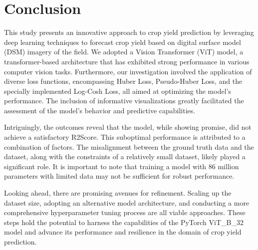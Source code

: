 \section{Conclusion}
\label{sec:conclusion}

This study presents an innovative approach to crop yield prediction by leveraging deep learning techniques to forecast crop yield based on digital surface model (DSM) imagery of the field. We adopted a Vision Transformer (ViT) model, a transformer-based architecture that has exhibited strong performance in various computer vision tasks. Furthermore, our investigation involved the application of diverse loss functions, encompassing Huber Loss, Pseudo-Huber Loss, and the specially implemented Log-Cosh Loss, all aimed at optimizing the model's performance. The inclusion of informative visualizations greatly facilitated the assessment of the model's behavior and predictive capabilities.

Intriguingly, the outcomes reveal that the model, while showing promise, did not achieve a satisfactory R2Score. This suboptimal performance is attributed to a combination of factors. The misalignment between the ground truth data and the dataset, along with the constraints of a relatively small dataset, likely played a significant role. It is important to note that training a model with 86 million parameters with limited data may not be sufficient for robust performance.

Looking ahead, there are promising avenues for refinement. Scaling up the dataset size, adopting an alternative model architecture, and conducting a more comprehensive hyperparameter tuning process are all viable approaches. These steps hold the potential to harness the capabilities of the PyTorch ViT\_B\_32 model and advance its performance and resilience in the domain of crop yield prediction. 